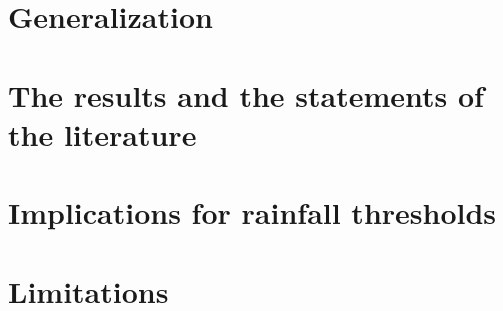 \documentclass[preprint,12pt,authoryear]{elsarticle}
\begin{document}


\section{Generalization}\label{sec:gen}



\section{The results and the statements of the literature}\label{sec:lit}



\section{Implications for rainfall thresholds}\label{sec:impl}



\section{Limitations}\label{sec:lim}
\end{document}
